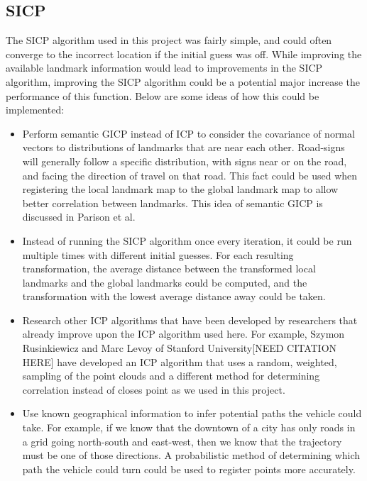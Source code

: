 \documentclass[letterpaper, 10 pt, conference]{ieeeconf}  %
\begin{document}
\subsection{SICP}
The SICP algorithm used in this project was fairly simple, and could often converge to the incorrect location if the initial guess was off. While improving the available landmark information would lead to improvements in the SICP algorithm, improving the SICP algorithm could be a potential major increase the performance of this function. Below are some ideas of how this could be implemented:

\begin{itemize}
\item Perform semantic GICP instead of ICP to consider the covariance of normal vectors to distributions of landmarks that are near each other. Road-signs will generally follow a specific distribution, with signs near or on the road, and facing the direction of travel on that road. This fact could be used when registering the local landmark map to the global landmark map to allow better correlation between landmarks. This idea of semantic GICP is discussed in Parison et al. \cite{cGICP}
\item Instead of running the SICP algorithm once every iteration, it could be run multiple times with different initial guesses. For each resulting transformation, the average distance between the transformed local landmarks and the global landmarks could be computed, and the transformation with the lowest average distance away could be taken.
\item Research other ICP algorithms that have been developed by researchers that already improve upon the ICP algorithm used here. For example, Szymon Rusinkiewicz and Marc Levoy of Stanford University[NEED CITATION HERE] have developed an ICP algorithm that uses a random, weighted, sampling of the point clouds and a different method for determining correlation instead of closes point as we used in this project.
\item Use known geographical information to infer potential paths the vehicle could take. For example, if we know that the downtown of a city has only roads in a grid going north-south and east-west, then we know that the trajectory must be one of those directions. A probabilistic method of determining which path the vehicle could turn could be used to register points more accurately.
\end{itemize}
\end{document}
